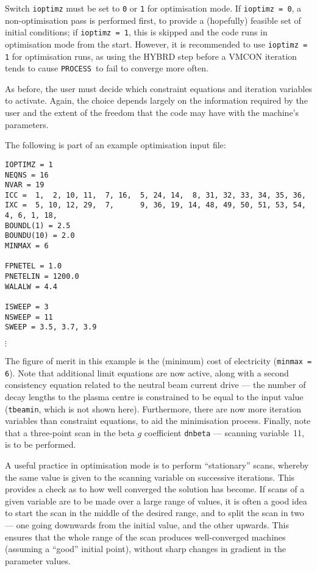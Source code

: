 \documentclass[11pt,a4paper]{report}
\newcommand{\process}{\mbox{\texttt{PROCESS}}}
\begin{document}
Switch \texttt{ioptimz} must be set to \texttt{0} or \texttt{1} for
optimisation mode. If \texttt{ioptimz = 0}, a non-optimisation pass is
performed first, to provide a (hopefully) feasible set of initial conditions;
if \texttt{ioptimz = 1}, this is skipped and the code runs in optimisation
mode from the start. However, it is recommended to use \texttt{ioptimz = 1}
for optimisation runs, as using the HYBRD step before a VMCON iteration tends
to cause \process\ to fail to converge more often.

As before, the user must decide which constraint equations and iteration
variables to activate. Again, the choice depends largely on the information
required by the user and the extent of the freedom that the code may have with
the machine's parameters.

The following is part of an example optimisation input file:
\begin{verbatim}
IOPTIMZ = 1
NEQNS = 16
NVAR = 19
ICC =  1,  2, 10, 11,  7, 16,  5, 24, 14,  8, 31, 32, 33, 34, 35, 36,
IXC =  5, 10, 12, 29,  7,      9, 36, 19, 14, 48, 49, 50, 51, 53, 54,
4, 6, 1, 18,
BOUNDL(1) = 2.5
BOUNDU(10) = 2.0
MINMAX = 6

FPNETEL = 1.0
PNETELIN = 1200.0
WALALW = 4.4

ISWEEP = 3
NSWEEP = 11
SWEEP = 3.5, 3.7, 3.9
\end{verbatim}
\vspace{-6mm}
$\vdots$

The figure of merit in this example is the (minimum) cost of electricity
(\texttt{minmax = 6}). Note that additional limit equations are now active,
along with a second consistency equation related to the neutral beam current
drive --- the number of decay lengths to the plasma centre is constrained to
be equal to the input value (\texttt{tbeamin}, which is not shown here).
Furthermore, there are now more iteration variables than constraint equations,
to aid the minimisation process.  Finally, note that a three-point scan in the
beta $g$ coefficient \texttt{dnbeta} --- scanning variable~11, is to be
performed.

A useful practice in optimisation mode is to perform ``stationary'' scans,
whereby the same value is given to the scanning variable on successive
iterations. This provides a check as to how well converged the solution has
become. If scans of a given variable are to be made over a large range of
values, it is often a good idea to start the scan in the middle of the desired
range, and to split the scan in two --- one going downwards from the initial
value, and the other upwards.  This ensures that the whole range of the scan
produces well-converged machines (assuming a ``good'' initial point), without
sharp changes in gradient in the parameter values.
\end{document}
